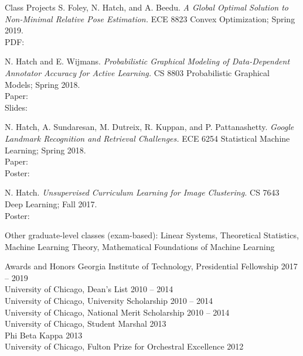 \documentclass{resume} %
\begin{document}
\begin{rSection}{Class Projects}
S. Foley, N. Hatch, and A. Beedu. {\em A Global Optimal Solution to Non-Minimal Relative Pose Estimation.} ECE 8823 Convex Optimization; Spring 2019. \\
PDF: 

N. Hatch and E. Wijmans. {\em Probabilistic Graphical Modeling of Data-Dependent Annotator Accuracy for Active Learning.} CS 8803 Probabilistic Graphical Models; Spring 2018. \\
Paper:  \\
Slides: 

N. Hatch, A. Sundaresan, M. Dutreix, R. Kuppan, and P. Pattanashetty. {\em Google Landmark Recognition and Retrieval Challenges.} ECE 6254 Statistical Machine Learning; Spring 2018. \\
Paper:  \\
Poster: 

N. Hatch. {\em Unsupervised Curriculum Learning for Image Clustering.} CS 7643 Deep Learning; Fall 2017. \\
Poster: 

Other graduate-level classes (exam-based): Linear Systems, Theoretical Statistics, Machine Learning Theory, Mathematical Foundations of Machine Learning
\end{rSection}

\begin{rSection}{Awards and Honors}
Georgia Institute of Technology, Presidential Fellowship \hfill 2017 – 2019 \\
University of Chicago, Dean's List \hfill 2010 – 2014 \\
University of Chicago, University Scholarship \hfill 2010 – 2014 \\
University of Chicago, National Merit Scholarship \hfill 2010 – 2014 \\
University of Chicago, Student Marshal \hfill 2013 \\
Phi Beta Kappa \hfill 2013 \\
University of Chicago, Fulton Prize for Orchestral Excellence \hfill 2012
\end{rSection}
\end{document}
